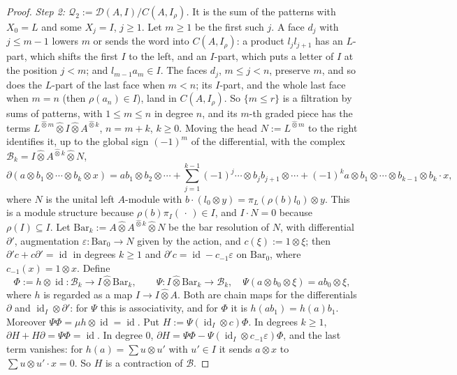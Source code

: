 \documentclass[11pt]{amsart}
\theoremstyle{definition}
\theoremstyle{remark}
\newcommand{\id}{\operatorname{id}}
\begin{document}
\begin{proof}
\emph{Step 2: $\mathcal Q_2:=\mathcal D(A,I)/C(A,I_{\rho})$.}  It is the sum of
the patterns with $X_0=L$ and some $X_j=I$, $j\ge1$.  Let $m\ge1$ be the first
such $j$.  A face $d_j$ with $j\le m-1$ lowers $m$ or sends the word into
$C(A,I_{\rho})$: a product $l_jl_{j+1}$ has an $L$-part, which shifts the
first $I$ to the left, and an $I$-part, which puts a letter of $I$ at the
position $j<m$; and $l_{m-1}a_m\in I$.  The faces $d_j$, $m\le j<n$, preserve
$m$, and so does the $L$-part of the last face when $m<n$; its $I$-part, and
the whole last face when $m=n$ (then $\rho(a_n)\in I$), land in
$C(A,I_{\rho})$.  So $\{m\le r\}$ is a filtration by sums of patterns, with
$1\le m\le n$ in degree $n$, and its $m$-th graded piece has the terms
$L^{\widehat\otimes m}\widehat\otimes I\widehat\otimes A^{\widehat\otimes k}$,
$n=m+k$, $k\ge0$.  Moving the head $N:=L^{\widehat\otimes m}$ to the right
identifies it, up to the global sign $(-1)^{m}$ of the differential, with the
complex $\mathcal B_k=I\widehat\otimes A^{\widehat\otimes k}\widehat\otimes N$,
\[
\partial(a\otimes b_1\otimes\cdots\otimes b_k\otimes x)=ab_1\otimes b_2\otimes\cdots
+\sum_{j=1}^{k-1}(-1)^{j}\cdots\otimes b_jb_{j+1}\otimes\cdots
+(-1)^{k}a\otimes b_1\otimes\cdots\otimes b_{k-1}\otimes b_k\cdot x ,
\]
where $N$ is the unital left $A$-module with
$b\cdot(l_0\otimes y)=\pi_L(\rho(b)l_0)\otimes y$.  This is a module
structure because $\rho(b)\pi_I(\,\cdot\,)\in I$, and $I\cdot N=0$ because
$\rho(I)\subseteq I$.  Let $\mathrm{Bar}_k:=A\widehat\otimes
A^{\widehat\otimes k}\widehat\otimes N$ be the bar resolution of $N$, with
differential $\partial'$, augmentation $\varepsilon:\mathrm{Bar}_0\to N$ given by
the action, and $c(\xi):=1\otimes\xi$; then $\partial'c+c\partial'=\id$ in
degrees $k\ge1$ and $\partial'c=\id-c_{-1}\varepsilon$ on $\mathrm{Bar}_0$, where
$c_{-1}(x)=1\otimes x$.  Define
\[
\Phi:=h\otimes\id:\mathcal B_k\to I\widehat\otimes\mathrm{Bar}_k,\qquad
\Psi:I\widehat\otimes\mathrm{Bar}_k\to\mathcal B_k,\quad
\Psi(a\otimes b_0\otimes\xi)=ab_0\otimes\xi,
\]
where $h$ is regarded as a map $I\to I\widehat\otimes A$.  Both are chain maps
for the differentials $\partial$ and $\id_I\otimes\partial'$: for $\Psi$ this is
associativity, and for $\Phi$ it is $h(ab_1)=h(a)b_1$.  Moreover
$\Psi\Phi=\mu h\otimes\id=\id$.  Put $H:=\Psi(\id_I\otimes c)\Phi$.  In degrees
$k\ge1$, $\partial H+H\partial=\Psi\Phi=\id$.  In degree $0$,
$\partial H=\Psi\Phi-\Psi(\id_I\otimes c_{-1}\varepsilon)\Phi$, and the last term
vanishes: for $h(a)=\sum u\otimes u'$ with $u'\in I$ it sends $a\otimes x$ to
$\sum u\otimes u'\cdot x=0$.  So $H$ is a contraction of $\mathcal B$.
\end{proof}
\end{document}
